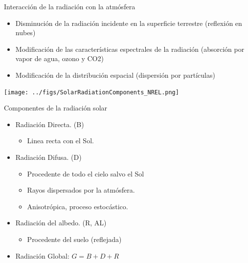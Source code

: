 \documentclass[xcolor={usenames,svgnames,dvipsnames}]{beamer}
\begin{document}
\begin{frame}[label={sec:orgbed80ca}]{Interacción de la radiación con la atmósfera}
\begin{itemize}
\item \alert{Disminución} de la radiación incidente en la superficie terrestre
(reflexión en nubes)

\item \alert{Modificación de las características espectrales} de la radiación
(absorción por vapor de agua, ozono y CO2)

\item \alert{Modificación de la distribución espacial} (dispersión por
partículas)
\end{itemize}

\begin{center}
\texttt{[image: ../figs/SolarRadiationComponents\_NREL.png]}
\end{center}
\end{frame}

\begin{frame}[label={sec:orgdb859ba}]{Componentes de la radiación solar}
\begin{itemize}
\item \alert{Radiación Directa}. (B)

\begin{itemize}
\item Linea recta con el Sol.
\end{itemize}

\item \alert{Radiación Difusa}. (D)

\begin{itemize}
\item Procedente de todo el cielo salvo el Sol

\item Rayos dispersados por la atmósfera.

\item Anisotrópica, proceso estocástico.
\end{itemize}

\item \alert{Radiación del albedo}. (R, AL)

\begin{itemize}
\item Procedente del suelo (reflejada)
\end{itemize}

\item \alert{Radiación Global:} \(G=B+D+R\)
\end{itemize}
\end{frame}
\end{document}
